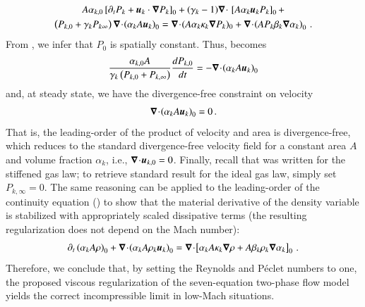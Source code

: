 \documentclass[preprint,10pt]{elsarticle}
\begin{document}
%
\begin{multline}\label{eq:asympt_equ3_ener}
A \alpha_{k,0} \left[ \partial_t  P_k  + \mbold u_k \cdot \grad  P_k \right]_0 + 
(\gamma_k-1) \div \ \left[ A \alpha_k \mbold u_k P_k \right]_0 +\\ 
\left( P_{k,0} +  \gamma_k P_{k\infty} \right) \div  \left(\alpha_k A \mbold u_k \right )_0 = 
\div (A \alpha_k \kappa_k \grad P_k)_0 + \div \left( A P_k \beta_k \grad \alpha_k \right)_0 \,.
\end{multline}
%
From , we infer that $P_0$ is spatially constant. Thus,  becomes
%
\begin{equation}\label{eq:div_free_energy}
\frac{\alpha_{k,0}  A}{\gamma_k\left( P_{k,0} + P_{k,\infty} \right)} \frac{d P_{k,0}}{dt} = - \boldsymbol\nabla\! \cdot \! \left( \alpha_k A \boldsymbol u_k \right)_0 
\end{equation}
%
and, at steady state, we have the divergence-free constraint on velocity
%
\begin{equation}
\boldsymbol\nabla\! \cdot \! \left( \alpha_k A \boldsymbol u_k \right)_0  = 0 \, .
\end{equation}
%
That is, the leading-order of the product of velocity and area is divergence-free, which reduces to the standard divergence-free 
velocity field for a constant area $A$ and volume fraction $\alpha_k$, i.e., $\boldsymbol\nabla\! \cdot \! \boldsymbol u_{k,0}=0$. Finally, recall that 
 was written for the stiffened gas law; to retrieve standard result for the ideal gas law, simply set $P_{k,\infty}=0$. 
%
The same reasoning can be applied to the leading-order 
of the continuity equation () to show that the material derivative of the density variable is stabilized with 
appropriately scaled dissipative terms (the resulting regularization does not depend on the Mach number):
\begin{multline}
\partial_t \left( \alpha_k A \rho\right)_0 + \boldsymbol\nabla\! \cdot \! \left( \alpha_k A \rho_k \boldsymbol u_k \right)_0 =
\boldsymbol\nabla\! \cdot \! \left[ \alpha_k A \kappa_k \boldsymbol\nabla \rho + A \beta_k \rho_k \boldsymbol\nabla \alpha_k \right]_0 \, .
\end{multline}
%
Therefore, we conclude that, by setting the Reynolds and P\'eclet numbers to one, the proposed viscous regularization
of the seven-equation two-phase flow model yields the correct incompressible limit in low-Mach situations.
\end{document}
